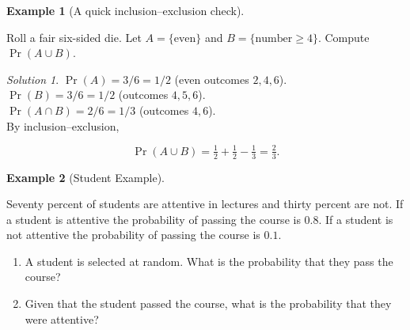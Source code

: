 \documentclass[
  letterpaper,
  DIV=11,
  numbers=noendperiod]{scrreprt}
\providecommand{\tightlist}{%
  \setlength{\itemsep}{0pt}\setlength{\parskip}{0pt}}
\theoremstyle{definition}
\newtheorem{example}{Example}[chapter]
\theoremstyle{plain}
\theoremstyle{definition}
\theoremstyle{remark}
\newtheorem{refsolution}{Solution}[chapter]
\begin{document}
\begin{example}[A quick inclusion--exclusion
check]\protect\hypertarget{exm-quick-inclusion-check}{}\label{exm-quick-inclusion-check}

Roll a fair six-sided die. Let \(A=\{\text{even}\}\) and
\(B=\{\text{number} \ge 4\}\). Compute \(\Pr(A\cup B)\).

\end{example}

\begin{refsolution}
\(\Pr(A)=3/6=1/2\) (even outcomes \(2,4,6\)).\\
\(\Pr(B)=3/6=1/2\) (outcomes \(4,5,6\)).\\
\(\Pr(A\cap B)=2/6=1/3\) (outcomes \(4,6\)).\\
By inclusion--exclusion,

\[
\Pr(A\cup B)=\tfrac{1}{2}+\tfrac{1}{2}-\tfrac{1}{3}=\tfrac{2}{3}.
\]

\label{sol-quick-inclusion-check}

\end{refsolution}

\begin{example}[Student
Example]\protect\hypertarget{exm-student-example}{}\label{exm-student-example}

Seventy percent of students are attentive in lectures and thirty percent
are not. If a student is attentive the probability of passing the course
is \(0.8\). If a student is not attentive the probability of passing the
course is \(0.1\).

\begin{enumerate}
\def\labelenumi{\arabic{enumi}.}
\tightlist
\item
  A student is selected at random. What is the probability that they
  pass the course?
\item
  Given that the student passed the course, what is the probability that
  they were attentive?
\end{enumerate}

\end{example}
\end{document}
